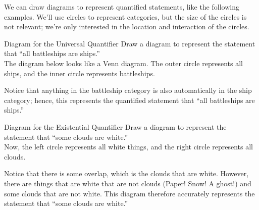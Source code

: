 We can draw diagrams to represent quantified statements, like the following examples.  We'll use circles to represent categories, but the size of the circles is not relevant; we're only interested in the location and interaction of the circles.
\pagebreak

\begin{example}[https://www.youtube.com/watch?v=y1Rm8lB3fzw]{Diagram for the Universal Quantifier}
Draw a diagram to represent the statement that ``all battleships are ships.''\\

\sol
The diagram below looks like a Venn diagram.  The outer circle represents all ships, and the inner circle represents battleships.

\begin{center}
\end{center}

Notice that anything in the battleship category is also automatically in the ship category; hence, this represents the quantified statement that ``all battleships are ships.''
\end{example}

\begin{example}[https://www.youtube.com/watch?v=m21zOUD-c4w]{Diagram for the Existential Quantifier}
Draw a diagram to represent the statement that ``some clouds are white.''\\

\sol
Now, the left circle represents all white things, and the right circle represents all clouds.

\begin{center}
\end{center}

Notice that there is some overlap, which is the clouds that are white.  However, there are things that are white that are not clouds (Paper! Snow! A ghost!) and some clouds that are not white.  This diagram therefore accurately represents the statement that ``some clouds are white.''
\end{example}

